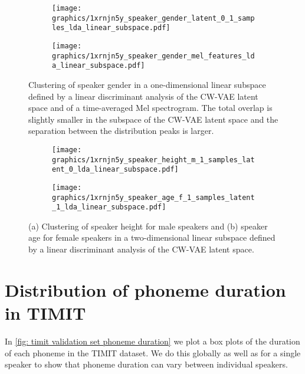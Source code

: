 {\begin{figure}[t!]
     \centering
     \hfill
     \begin{subfigure}[b]{0.48\textwidth}
         \centering
         \texttt{[image: graphics/1xrnjn5y\_speaker\_gender\_latent\_0\_1\_samples\_lda\_linear\_subspace.pdf]}
         \caption{}
         \label{fig: latent space gender}
     \end{subfigure}
     \hfill
     \begin{subfigure}[b]{0.48\textwidth}
         \centering
         \texttt{[image: graphics/1xrnjn5y\_speaker\_gender\_mel\_features\_lda\_linear\_subspace.pdf]}
         \caption{}
         \label{fig: mel features gender}
     \end{subfigure}
    \caption{Clustering of speaker gender in a one-dimensional linear subspace defined by a linear discriminant analysis of the CW-VAE latent space and of a time-averaged Mel spectrogram. The total overlap is slightly smaller in the subspace of the CW-VAE latent space and the separation between the distribution peaks is larger.}
    \label{fig: latent space visualization gender}
\end{figure}


\begin{figure}[t!]
     \centering
     \hfill
     \begin{subfigure}[b]{0.48\textwidth}
         \centering
         \texttt{[image: graphics/1xrnjn5y\_speaker\_height\_m\_1\_samples\_latent\_0\_lda\_linear\_subspace.pdf]}
         \caption{}
         \label{fig: cwvae latent z1 height}
     \end{subfigure}
     \hfill
     \begin{subfigure}[b]{0.48\textwidth}
         \centering
         \texttt{[image: graphics/1xrnjn5y\_speaker\_age\_f\_1\_samples\_latent\_1\_lda\_linear\_subspace.pdf]}
         \caption{}
         \label{fig: cwvae latent z0 age}
     \end{subfigure}
    \caption{(a) Clustering of speaker height for male speakers and (b) speaker age for female speakers in a two-dimensional linear subspace defined by a linear discriminant analysis of the CW-VAE latent space.}
    \label{fig: cwvae latent height}
\end{figure}




\section{Distribution of phoneme duration in TIMIT}\label{app: timit phoneme distributions}
In \cref{fig: timit validation set phoneme duration} we plot a box plots of the duration of each phoneme in the TIMIT dataset. We do this globally as well as for a single speaker to show that phoneme duration can vary between individual speakers. 

}

